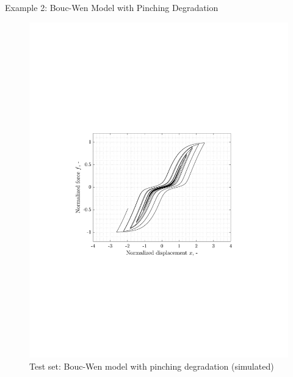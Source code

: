 \documentclass[9pt]{beamer}
\newcounter{frame}[frame]
\begin{document}
\begin{frame}{Example 2: Bouc-Wen Model with Pinching Degradation}
\begin{figure}
	\includegraphics[height=.8\textheight]{neuralNetHysteresis02}
	\caption{Test set: Bouc-Wen model with pinching degradation (simulated)}
\end{figure}
\end{frame}
\end{document}
